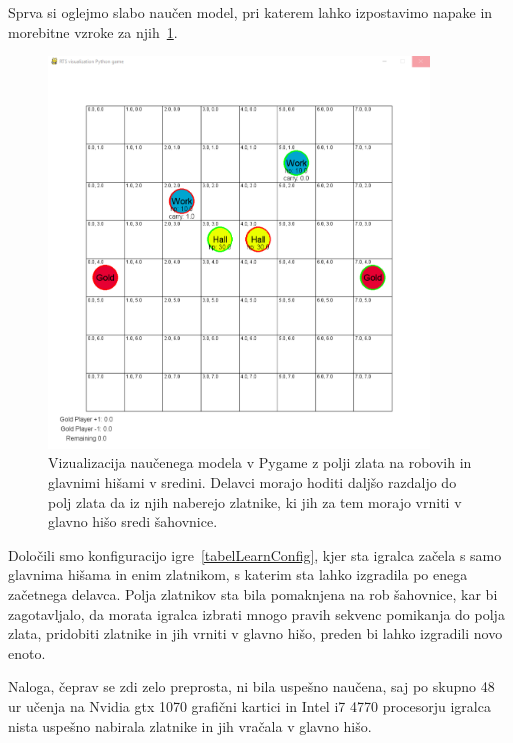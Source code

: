 \documentclass[a4paper, 12pt]{book}
\begin{document}
Sprva si oglejmo slabo naučen model, pri katerem lahko izpostavimo napake in morebitne vzroke za njih~\ref{vizualizacijaRezultatovSpremembaZlata}.
\begin{figure}[h!]
	\begin{center}
		\includegraphics[width=0.9\textwidth]{photos/third-2018-11-14.pdf}
	\end{center}
	\caption{Vizualizacija naučenega modela v Pygame z polji zlata na robovih in glavnimi hišami v sredini. Delavci morajo hoditi daljšo razdaljo do polj zlata da iz njih naberejo zlatnike, ki jih za tem morajo vrniti v glavno hišo sredi šahovnice. }
	\label{vizualizacijaRezultatovSpremembaZlata}
\end{figure}

Določili smo konfiguracijo igre~\ref{tabelLearnConfig}, kjer sta igralca začela s samo glavnima hišama in enim zlatnikom, s katerim sta lahko izgradila po enega začetnega delavca.
Polja zlatnikov sta bila pomaknjena na rob šahovnice, kar bi zagotavljalo, da morata igralca izbrati mnogo pravih sekvenc pomikanja do polja zlata, pridobiti zlatnike in jih vrniti v glavno hišo, preden bi lahko izgradili novo enoto.

Naloga, čeprav se zdi zelo preprosta, ni bila uspešno naučena, saj po skupno 48 ur učenja na Nvidia gtx 1070 grafični kartici in Intel i7 4770 procesorju igralca nista uspešno nabirala zlatnike in jih vračala v glavno hišo.
\end{document}
